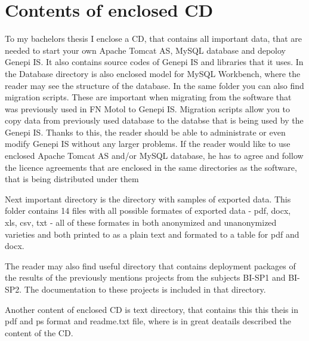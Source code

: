 \documentclass[thesis=B,english]{FITthesis}[2012/10/20]
\begin{document}
\chapter{Contents of enclosed CD}
To my bachelors thesis I enclose a CD, that contains all important data, that are needed to start your own Apache Tomcat AS, MySQL database and depoloy Genepi IS. It also contains source codes of Genepi IS and libraries that it uses. In the Database directory is also enclosed model for MySQL Workbench, where the reader may see the structure of the database. In the same folder you can also find migration scripts. These are important when migrating from the software that was previously used in FN Motol to Genepi IS. Migration scripts allow you to copy data from previously used database to the databse that is being used by the Genepi IS.
Thanks to this, the reader should be able to administrate or even modify Genepi IS without any larger problems. If the reader would like to use enclosed Apache Tomcat AS and/or MySQL database, he has to agree and follow the licence agreements that are enclosed in the same directories as the software, that is being distributed under them

Next important directory is the directory with samples of exported data. This folder contains 14 files with all possible formates of exported data - pdf, docx, xls, csv, txt - all of these formates in both anonymized and unanonymized varieties and both printed to as a plain text and formated to a table for pdf and docx.

The reader may also find useful directory that contains deployment packages of the results of the previously mentions projects from the subjects BI-SP1 and BI-SP2. The documentation to these projects is included in that directory.

Another content of enclosed CD is text directory, that contains this this theis in pdf and ps format and readme.txt file, where is in great deatails described the content of the CD.
\end{document}
